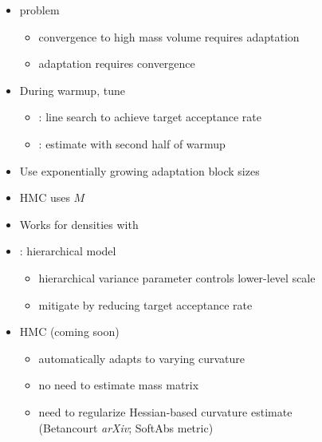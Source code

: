 \documentclass[10pt]{report}
\newcommand{\sld}[1]{\newpage{\noindent\LARGE \ \ \
    \textcolor{MidnightBlue}{\bfseries #1}}\vspace*{4pt}}
\newcommand{\myemph}[1]{{\color{MidnightBlue}{\bfseries #1}}}
\begin{document}
\begin{itemize}
\item \myemph{Chicken-and-egg} problem
  \vspace*{-4pt}
  \begin{itemize}\small
  \item convergence to high mass volume requires adaptation 
  \item adaptation requires convergence
  \end{itemize}
\item During warmup, tune
  \vspace*{-4pt}
  \begin{itemize}\small
  \item \myemph{step size}: line search to achieve target acceptance
    rate
  \item \myemph{mass matrix}: estimate with second half of warmup
  \end{itemize}
\item Use exponentially growing adaptation block sizes
\end{itemize}

\sld{Position-Independent Curvature}

\begin{itemize}
\item \myemph{Euclidean} HMC uses \myemph{global mass matrix} $M$
\item Works for densities with \myemph{position-independent curvature}
\item \myemph{Counterexample}: hierarchical model
  \vspace*{-4pt}
  \begin{itemize}\small
  \item hierarchical variance parameter controls lower-level scale
  \item mitigate by reducing target acceptance rate
  \end{itemize}
  \vfill
\item \myemph{Riemannian-manifold} HMC (coming soon)
  \vspace*{-4pt}
  \begin{itemize}\small
  \item automatically adapts to varying curvature
  \item no need to estimate mass matrix
  \item need to regularize Hessian-based curvature estimate
    \\ {\footnotesize (Betancourt {\slshape arXiv}; SoftAbs metric)}
  \end{itemize}
\end{itemize}
\end{document}
